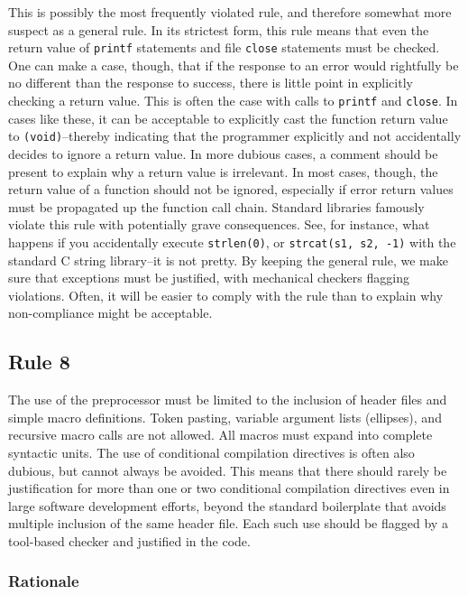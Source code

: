 \documentclass[11pt,oneside]{article}
\begin{document}
This is possibly the most frequently violated rule, and therefore somewhat more
suspect as a general rule. In its strictest form, this rule means that even the
return value of \texttt{printf} statements and file \texttt{close} statements
must be checked. One can make a case, though, that if the response to an error
would rightfully be no different than the response to success, there is little
point in explicitly checking a return value. This is often the case with calls
to \texttt{printf} and \texttt{close}. In cases like these, it can be
acceptable to explicitly cast the function return value to
\texttt{(void)}--thereby indicating that the programmer explicitly and not
accidentally decides to ignore a return value. In more dubious cases, a comment
should be present to explain why a return value is irrelevant. In most cases,
though, the return value of a function should not be ignored, especially if
error return values must be propagated up the function call chain. Standard
libraries famously violate this rule with potentially grave consequences. See,
for instance, what happens if you accidentally execute \texttt{strlen(0)}, or
\texttt{strcat(s1, s2, -1)} with the standard C string library--it is not
pretty. By keeping the general rule, we make sure that exceptions must be
justified, with mechanical checkers flagging violations. Often, it will be
easier to comply with the rule than to explain why non-compliance might be
acceptable.

\subsection{Rule 8}

The use of the preprocessor must be limited to the inclusion of header files
and simple macro definitions. Token pasting, variable argument lists
(ellipses), and recursive macro calls are not allowed. All macros must expand
into complete syntactic units. The use of conditional compilation directives is
often also dubious, but cannot always be avoided. This means that there should
rarely be justification for more than one or two conditional compilation
directives even in large software development efforts, beyond the standard
boilerplate that avoids multiple inclusion of the same header file.  Each such
use should be flagged by a tool-based checker and justified in the code.

\subsubsection*{Rationale}
\end{document}
